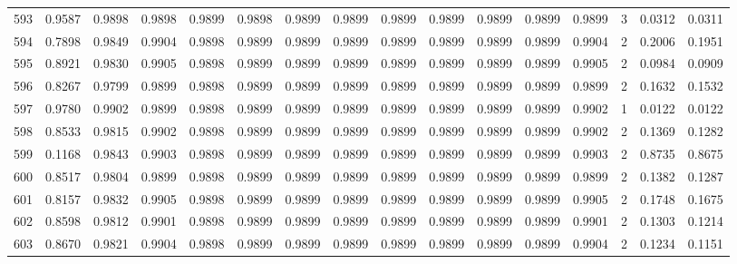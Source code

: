 \begin{tabular}{lrrrrrrrrrrrrrrr}
593 &      0.9587 &  0.9898 &  0.9898 &  0.9899 &  0.9898 &  0.9899 &  0.9899 &  0.9899 &  0.9899 &  0.9899 &   0.9899 &     0.9899 &      3 &                    0.0312 &                     0.0311 \\
594 &      0.7898 &  0.9849 &  0.9904 &  0.9898 &  0.9899 &  0.9899 &  0.9899 &  0.9899 &  0.9899 &  0.9899 &   0.9899 &     0.9904 &      2 &                    0.2006 &                     0.1951 \\
595 &      0.8921 &  0.9830 &  0.9905 &  0.9898 &  0.9899 &  0.9899 &  0.9899 &  0.9899 &  0.9899 &  0.9899 &   0.9899 &     0.9905 &      2 &                    0.0984 &                     0.0909 \\
596 &      0.8267 &  0.9799 &  0.9899 &  0.9898 &  0.9899 &  0.9899 &  0.9899 &  0.9899 &  0.9899 &  0.9899 &   0.9899 &     0.9899 &      2 &                    0.1632 &                     0.1532 \\
597 &      0.9780 &  0.9902 &  0.9899 &  0.9898 &  0.9899 &  0.9899 &  0.9899 &  0.9899 &  0.9899 &  0.9899 &   0.9899 &     0.9902 &      1 &                    0.0122 &                     0.0122 \\
598 &      0.8533 &  0.9815 &  0.9902 &  0.9898 &  0.9899 &  0.9899 &  0.9899 &  0.9899 &  0.9899 &  0.9899 &   0.9899 &     0.9902 &      2 &                    0.1369 &                     0.1282 \\
599 &      0.1168 &  0.9843 &  0.9903 &  0.9898 &  0.9899 &  0.9899 &  0.9899 &  0.9899 &  0.9899 &  0.9899 &   0.9899 &     0.9903 &      2 &                    0.8735 &                     0.8675 \\
600 &      0.8517 &  0.9804 &  0.9899 &  0.9898 &  0.9899 &  0.9899 &  0.9899 &  0.9899 &  0.9899 &  0.9899 &   0.9899 &     0.9899 &      2 &                    0.1382 &                     0.1287 \\
601 &      0.8157 &  0.9832 &  0.9905 &  0.9898 &  0.9899 &  0.9899 &  0.9899 &  0.9899 &  0.9899 &  0.9899 &   0.9899 &     0.9905 &      2 &                    0.1748 &                     0.1675 \\
602 &      0.8598 &  0.9812 &  0.9901 &  0.9898 &  0.9899 &  0.9899 &  0.9899 &  0.9899 &  0.9899 &  0.9899 &   0.9899 &     0.9901 &      2 &                    0.1303 &                     0.1214 \\
603 &      0.8670 &  0.9821 &  0.9904 &  0.9898 &  0.9899 &  0.9899 &  0.9899 &  0.9899 &  0.9899 &  0.9899 &   0.9899 &     0.9904 &      2 &                    0.1234 &                     0.1151 \\

\end{tabular}
